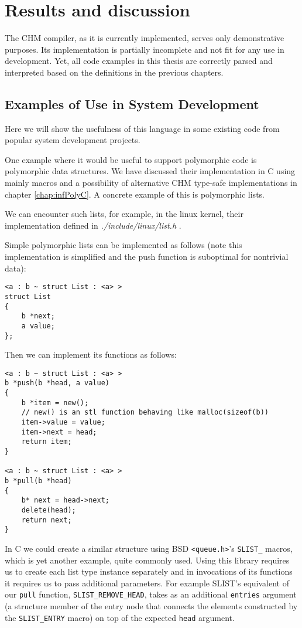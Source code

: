 
\chapter{Results and discussion}

The CHM compiler, as it is currently implemented, serves only demonstrative purposes. Its implementation is partially incomplete and not fit for any use in development. Yet, all code examples in this thesis are correctly parsed and interpreted based on the definitions in the previous chapters.

\section{Examples of Use in System Development}

Here we will show the usefulness of this language in some existing code from popular system development projects.

One example where it would be useful to support polymorphic code is polymorphic data structures. We have discussed their implementation in C using mainly macros and a possibility of alternative CHM type-safe implementations in chapter \ref{chap:infPolyC}. A concrete example of this is polymorphic lists.

We can encounter such lists, for example, in the linux kernel, their implementation defined in \emph{./include/linux/list.h} \cite{torvalds2018linux}.

Simple polymorphic lists can be implemented as follows (note this implementation is simplified and the push function is suboptimal for nontrivial data):

\begin{lstlisting}
<a : b ~ struct List : <a> >
struct List
{
    b *next;
    a value;
};
\end{lstlisting}

Then we can implement its functions as follows:

\begin{lstlisting}
<a : b ~ struct List : <a> >
b *push(b *head, a value)
{
    b *item = new();
    // new() is an stl function behaving like malloc(sizeof(b))
    item->value = value;
    item->next = head;
    return item;
}

<a : b ~ struct List : <a> >
b *pull(b *head)
{
    b* next = head->next;
    delete(head);
    return next;
}
\end{lstlisting}

In C we could create a similar structure using BSD \lstinline{<queue.h>}'s \cite{pages2007queue} \lstinline{SLIST_} macros, which is yet another example, quite commonly used. Using this library requires us to create each list type instance separately and in invocations of its functions it requires us to pass additional parameters. For example SLIST's equivalent of our \lstinline{pull} function, \lstinline{SLIST_REMOVE_HEAD}, takes as an additional \lstinline{entries} argument (a structure member of the entry node that connects the elements constructed by the \lstinline{SLIST_ENTRY} macro) on top of the expected \lstinline{head} argument.

